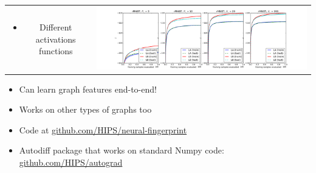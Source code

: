 \documentclass[landscape,a0b,final,a4resizeable]{include/a0poster}
\begin{document}
\begin{poster}
\begin{multicols}{3}
\begin{tabular}{cc}
\begin{minipage}[c]{0.25\columnwidth}
\begin{itemize}
\item Different activations functions
\end{itemize}
\end{minipage} & 
\begin{minipage}[c]{0.75\columnwidth}
\includegraphics[width=1.0\columnwidth, clip, trim=4mm 0mm 4mm 4mm]{figures/mnist_LAvsLB}
\end{minipage}
\end{tabular}

\begin{itemize}
\item Can learn graph features end-to-end!
\item Works on other types of graphs too 
\item Code at \url{github.com/HIPS/neural-fingerprint}
\item Autodiff package that works on standard Numpy code:\\ \url{github.com/HIPS/autograd}
\end{itemize}



\end{multicols}
\end{poster}
\end{document}
